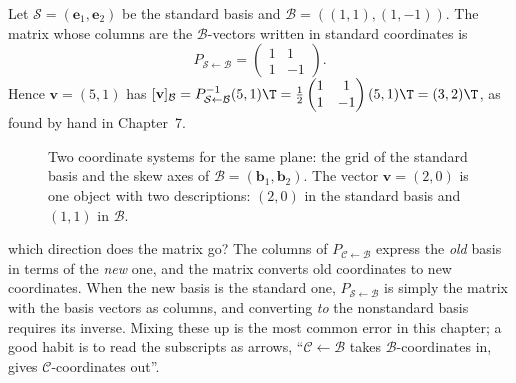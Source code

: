 \begin{example}[Coordinates in $\R^2$]\label{ex:coordchange}
Let $\mathcal{S}=(\mathbf{e}_1,\mathbf{e}_2)$ be the standard basis and $\mathcal{B}=((1,1),(1,-1))$. The matrix whose columns are the $\mathcal{B}$-vectors written in standard coordinates is
\[ P_{\mathcal{S}\leftarrow\mathcal{B}}=\begin{pmatrix}1&1\\1&-1\end{pmatrix}. \]
Hence $\mathbf{v}=(5,1)$ has $[\mathbf{v}]_{\mathcal{B}}=P_{\mathcal{S}\leftarrow\mathcal{B}}^{-1}(5,1)\T=\tfrac12\begin{pmatrix}1&1\\1&-1\end{pmatrix}(5,1)\T=(3,2)\T$, as found by hand in Chapter~7.
\end{example}

\begin{figure}[h]
\centering
{}
\caption{Two coordinate systems for the same plane: the grid of the standard basis and the skew axes of $\mathcal{B}=(\mathbf{b}_1,\mathbf{b}_2)$. The vector $\mathbf{v}=(2,0)$ is one object with two descriptions: $(2,0)$ in the standard basis and $(1,1)$ in $\mathcal{B}$.}
\end{figure}

\begin{pitfall}{which direction does the matrix go?}
The columns of $P_{\mathcal{C}\leftarrow\mathcal{B}}$ express the \emph{old} basis in terms of the \emph{new} one, and the matrix converts old coordinates to new coordinates. When the new basis is the standard one, $P_{\mathcal{S}\leftarrow\mathcal{B}}$ is simply the matrix with the basis vectors as columns, and converting \emph{to} the nonstandard basis requires its inverse. Mixing these up is the most common error in this chapter; a good habit is to read the subscripts as arrows, ``$\mathcal{C}\leftarrow\mathcal{B}$ takes $\mathcal{B}$-coordinates in, gives $\mathcal{C}$-coordinates out''.
\end{pitfall}

